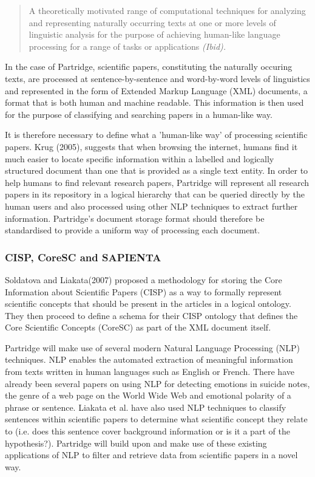 \documentclass[12pt,a4paper]{article}
\begin{document}
\begin{quotation} 
A theoretically motivated range of computational techniques for analyzing and
representing naturally occurring texts at one or more levels of linguistic
analysis for the purpose of achieving human-like language processing for a
range of tasks or applications \it{(Ibid)}.  
\end{quotation}

In the case of Partridge, scientific papers, constituting the naturally occuring
texts, are processed at sentence-by-sentence and word-by-word levels of
linguistics and represented in the form of Extended Markup Language (XML)
documents, a format that is both human and machine readable. This information
is then used for the purpose of classifying and searching papers in a
human-like way. 

It is therefore necessary to define what a 'human-like way' of processing
scientific papers.  Krug (2005), suggests that when browsing the internet,
humans find it much easier to locate specific information within a labelled and
logically structured document than one that is provided as a single text
entity\cite{Krug:2005:DMM:1051204}. In order to help humans to find relevant
research papers, Partridge will represent all research papers in its repository
in a logical hierarchy that can be queried directly by the human users and also
processed using other NLP techniques to extract further information.
Partridge's document storage format should therefore be standardised to provide
a uniform way of processing each document. 

\subsubsection{CISP, CoreSC and SAPIENTA}

Soldatova and Liakata(2007) proposed a methodology for storing the Core
Information about Scientific Papers (CISP) as a way to formally represent
scientific concepts that should be present in the articles in a logical
ontology\cite{soldatova2007ontology}. They then proceed to define a schema for
their CISP ontology that defines the Core Scientific Concepts (CoreSC) as part
of the XML document itself\cite{liakata2008guidelines}. 

Partridge will make use of
several modern Natural Language Processing (NLP) techniques.  NLP enables the
automated extraction of meaningful information from texts written in human
languages such as English or French. There have already been several papers on
using NLP for detecting emotions in suicide notes\cite{citeulike:11077287}, the
genre of a web page on the World Wide Web\cite{citeulike:11288938} and
emotional polarity of a phrase or sentence\cite{Wilson05Polarity}. Liakata et
al. have also used NLP techniques to classify sentences within scientific
papers to determine what scientific concept they relate to (i.e. does this
sentence cover background information or is it a part of the
hypothesis?). Partridge will build upon and make use
of these existing applications of NLP to filter and retrieve data from
scientific papers in a novel way.
\end{document}
